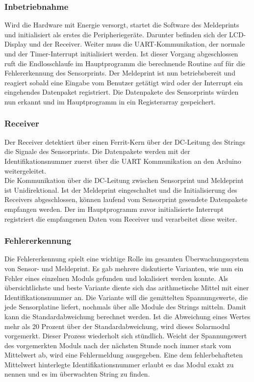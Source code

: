 \subsubsection{Inbetriebnahme}
Wird die Hardware mit Energie versorgt, startet die Software des Meldeprints und initialisiert als erstes die Peripheriegeräte. Darunter befinden sich der LCD-Display und der Receiver. Weiter muss die UART-Kommunikation, der normale und der Timer-Interrupt initialisiert werden. Ist dieser Vorgang abgeschlossen ruft die Endlosschlaufe im Hauptprogramm die berechnende Routine auf für die Fehlererkennung des Sensorprints. Der Meldeprint ist nun betriebsbereit und reagiert sobald eine Eingabe vom Benutzer getätigt wird oder der Interrupt ein eingehendes Datenpaket registriert. Die Datenpakete des Sensorprints würden nun erkannt und im Hauptprogramm in ein Registerarray gespeichert.

\subsubsection{Receiver}
Der Receiver detektiert über einen Ferrit-Kern über der DC-Leitung des Strings die Signale des Sensorprints. Die Datenpakete werden mit der Identifikationsnummer zuerst über die UART Kommunikation an den Arduino weitergeleitet.\\
Die Kommunikation über die DC-Leitung zwischen Sensorprint und Meldeprint ist Unidirektional. Ist der Meldeprint eingeschaltet und die Initialisierung des Receivers abgeschlossen, können laufend vom Sensorprint gesendete Datenpakete empfangen werden. Der im Hauptprogramm zuvor initialisierte Interrupt registriert die empfangenen Daten vom Receiver und verarbeitet diese weiter.

\subsubsection{Fehlererkennung}
Die Fehlererkennung spielt eine wichtige Rolle im gesamten Überwachungssystem von Sensor- und Meldeprint. Es gab mehrere diskutierte Varianten, wie nun ein Fehler eines einzelnen Moduls gefunden und lokalisiert werden konnte. Als übersichtlichste und beste Variante diente sich das arithmetische Mittel mit einer Identifikationsnummer an. Die Variante will die gemittelten Spannungswerte, die jede Sensorplatine liefert, nochmals über alle Module des Strings mitteln. Damit kann die Standardabweichung berechnet werden. Ist die Abweichung eines Wertes mehr als 20 Prozent über der Standardabweichung, wird dieses Solarmodul vorgemerkt. Dieser Prozess  wiederholt sich stündlich. Weicht der Spannungswert des vorgemerkten Moduls nach der nächsten Stunde noch immer stark vom Mittelwert ab, wird eine Fehlermeldung ausgegeben. Eine dem fehlerbehafteten Mittelwert hinterlegte Identifikationsnummer erlaubt es das Modul exakt zu nennen und es im überwachten String zu finden.

